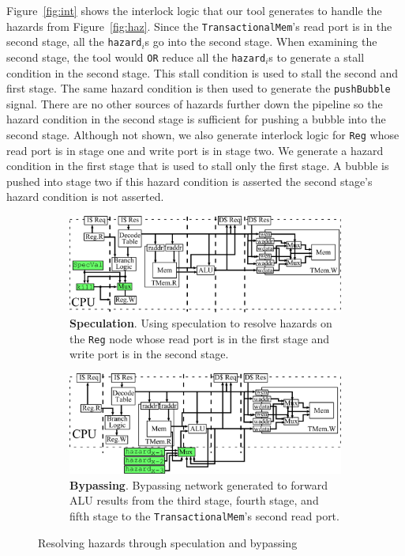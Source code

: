 Figure~\ref{fig:int} shows the interlock logic that our tool
generates to handle the hazards from Figure~\ref{fig:haz}. Since
the {\tt TransactionalMem}'s read port is in the second stage, all the
{\tt hazard$_i$}s go into the second stage. When examining the second
stage, the tool would {\tt OR} reduce all the {\tt hazard}$_i$s to
generate a stall condition in the second stage. This stall condition
is used to stall the second and first stage. The same hazard
condition is then used to generate the {\tt pushBubble} signal. There
are no other sources of hazards further down the pipeline so the
hazard condition in the second stage is sufficient for pushing a
bubble into the second stage. Although not shown, we also generate
interlock logic for {\tt Reg} whose read port is in stage one and
write port is in stage two. We generate a hazard condition in the
first stage that is used to stall only the first stage. A bubble is
pushed into stage two if this hazard condition is asserted the second
stage's hazard condition is not asserted.

\begin{figure}[htb]
\centering
  \begin{subfigure}[t]{0.8\textwidth}
  \centering
  \includegraphics[width=\textwidth]{figures/pipelinespec.pdf}
  \caption{{\bf Speculation}. Using speculation to resolve hazards on
    the {\tt Reg} node whose read port is in the first stage and write port
  is in the second stage.}
  \label{fig:spec}
  \end{subfigure}
  \begin{subfigure}[t]{0.8\textwidth}
  \vspace{20pt}
  \centering
  \includegraphics[width=\textwidth]{figures/pipelinebypass.pdf}
  \caption{{\bf Bypassing}. Bypassing network generated to forward ALU
  results from the third stage, fourth stage, and fifth stage to the
  {\tt TransactionalMem}'s second read port.}
  \label{fig:bypass}
  \end{subfigure}
\caption{Resolving hazards through speculation and bypassing}
\label{fig:specbyp}
\end{figure}

